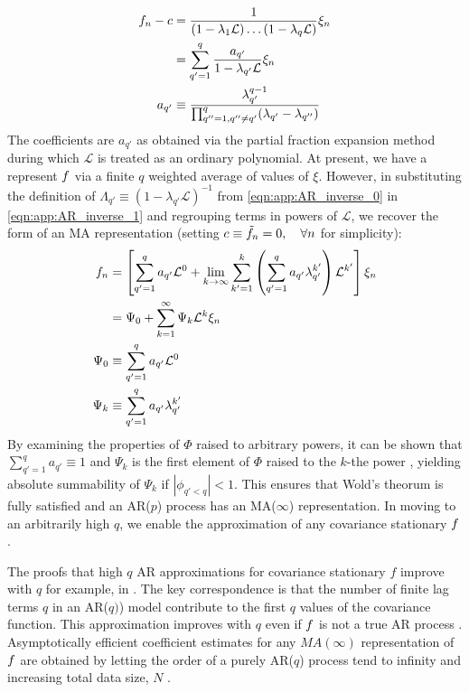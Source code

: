 \begin{align}
f_n - c & = \frac{1}{(1 - \lambda_1 \mathcal{L}) \hdots (1 - \lambda_q \mathcal{L})} \xi_n\\
& = \sum_{q'=1}^{q}\frac{a_{q'}}{1- \lambda_{q'} \mathcal{L}} \xi_n  \label{eqn:app:AR_inverse_1}\\
a_{q'} & \equiv \frac{\lambda_{q'}^{q-1}}{\prod_{q''=1, q''\neq q'}^{q} (\lambda_{q'} - \lambda_{q''})}
\end{align} The coefficients are $a_{q'}$ as obtained via the partial fraction expansion method during which $\mathcal{L}$ is treated as an ordinary polynomial. At present, we have a represent $f$ via a finite $q$ weighted average of values of $\xi$. However, in substituting the definition of $ \Lambda_{q'} \equiv (1- \lambda_{q'} \mathcal{L})^{-1}$ from \cref{eqn:app:AR_inverse_0} in \cref{eqn:app:AR_inverse_1} and regrouping terms in powers of $\mathcal{L}$, we recover the form of an MA representation (setting $c \equiv \tilde{f}_n  = 0, \quad  \forall n$ for simplicity): 
\begin{align}
f_n & = \left[ \sum_{q'=1}^{q} a_{q'} \mathcal{L}^0 +  \lim_{k \to \infty}  \sum_{k'=1}^{k} \left( \sum_{q'=1}^{q} a_{q'}  \lambda_{q'}^{k'} \right) \mathcal{L}^{k'}\right] \xi_n \\
& = \Psi_0 + \sum_{k=1}^{\infty} \Psi_k \mathcal{L}^k \xi_{n}  \\
\Psi_0 & \equiv \sum_{q'=1}^{q} a_{q'} \mathcal{L}^0  \\
\Psi_k & \equiv \sum_{q'=1}^{q} a_{q'}  \lambda_{q'}^{k'}
\end{align}
By examining the properties of $\Phi$ raised to arbitrary powers, it can be shown that $\sum_{q'=1}^{q} a_{q'} \equiv 1$ and $\Psi_k$ is the first element of $\Phi$ raised to the $k$-the power \cite{hamilton1994time}, yielding absolute summability of $\Psi_k$ if $|\phi_{q'<q}| < 1$. This ensures that Wold's theorum is fully satisfied and an AR($p$) process has an MA($\infty$) representation. In moving to an arbitrarily high $q$, we enable the approximation of any covariance stationary $f$.

The proofs that high $q$ AR approximations for covariance stationary $f$ improve with $q$ for example, in \cite{wahlberg1989estimation}. The key correspondence is that the number of finite lag terms $q$ in an AR($q)$) model contribute to the first $q$ values of the covariance function. This approximation improves with $q$ even if $f$ is not a true AR process \cite{wahlberg1989estimation,west1996bayesian}. Asymptotically efficient coefficient estimates for any $MA(\infty)$ representation of $f$ are obtained by letting the order of a purely AR($q$) process tend to infinity and increasing total data size, $N$ \cite{wahlberg1989estimation}. 

